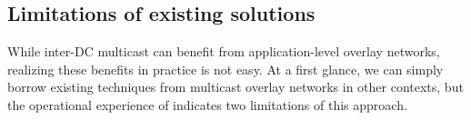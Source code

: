 
%
%
%
%

\subsection{Limitations of existing solutions}
\label{subsec:motivation:baseline}

While inter-DC multicast can benefit from application-level overlay networks,
realizing these benefits in practice
is not easy. At a first glance, we can simply borrow existing techniques
from multicast overlay networks in other contexts,
but the operational experience of \company indicates
two limitations of this approach.

